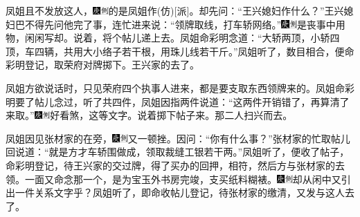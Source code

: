 凤姐且不发放这人，{{\includegraphics[width=3mm]{../Images/00004}\includegraphics[width=3mm]{../Images/00011}\footnotesize \kaishu 的是凤姐作{(仿)}{[}派{]}。}}却先问：``王兴媳妇作什么？''王兴媳妇巴不得先问他完了事，连忙进来说：``领牌取线，打车轿网络。''{\includegraphics[width=3mm]{../Images/00004}\includegraphics[width=3mm]{../Images/00011}\footnotesize \kaishu 是丧事中用物，闲闲写却。}说着，将个帖儿递上去。凤姐命彩明念道：``大轿两顶，小轿四顶，车四辆，共用大小络子若干根，用珠儿线若干斤。''凤姐听了，数目相合，便命彩明登记，取荣府对牌掷下。王兴家的去了。

凤姐方欲说话时，只见荣府四个执事人进来，都是要支取东西领牌来的。凤姐命彩明要了帖儿念过，听了共四件，凤姐因指两件说道：``这两件开销错了，再算清了来取。''{\includegraphics[width=3mm]{../Images/00004}\includegraphics[width=3mm]{../Images/00011}\footnotesize \kaishu 好看煞，这等文字。}说着掷下帖子来。那二人扫兴而去。

凤姐因见张材家的在旁，{\includegraphics[width=3mm]{../Images/00004}\includegraphics[width=3mm]{../Images/00011}\footnotesize \kaishu 又一顿挫。}因问：``你有什么事？''张材家的忙取帖儿回说道：``就是方才车轿围做成，领取裁缝工银若干两。''凤姐听了，便收了帖子，命彩明登记，待王兴家的交过牌，得了买办的回押，相符，然后方与张材家的去领。一面又命念那一个，是为宝玉外书房完竣，支买纸料糊裱。{\includegraphics[width=3mm]{../Images/00004}\includegraphics[width=3mm]{../Images/00011}\footnotesize \kaishu 却从闲中又引出一件关系文字乎？}凤姐听了，即命收帖儿登记，待张材家的缴清，又发与这人去了。

